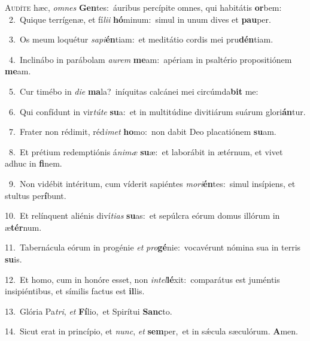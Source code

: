 \lettrine{\initial\textcolor{\initialcolor}{A}}{udíte} hæc, \textit{om}\-\textit{nes} \textbf{Gen}\-tes:~\star áuribus percípite omnes, qui habitátis \textbf{or}\-bem:\\
{\numbfont\textcolor{\numbcolor}{~2.}}~Quique terrígenæ, et fí\-\textit{li}\-\textit{i} \textbf{hó}\-minum:~\star simul in unum dives et \textbf{pau}\-per.\par
{\numbfont\textcolor{\numbcolor}{~3.}}~Os meum loquétur \textit{sa}\-\textit{pi}\textbf{én}tiam:~\star et meditátio cordis mei pru\-\textbf{dén}\-tiam.\par
{\numbfont\textcolor{\numbcolor}{~4.}}~Inclinábo in parábolam \textit{au}\-\textit{rem} \textbf{me}\-am:~\star apériam in psaltério propositiónem \textbf{me}\-am.\par
{\numbfont\textcolor{\numbcolor}{~5.}}~Cur timébo in \textit{di}\-\textit{e} \textbf{ma}\-la?~\star iníquitas calcánei mei circúmda\textbf{bit} me:\par
{\numbfont\textcolor{\numbcolor}{~6.}}~Qui confídunt in vir\-\textit{tú}\-\textit{te} \textbf{su}\-a:~\star et in multitúdine divitiárum suárum glori\-\textbf{án}\-tur.\par
{\numbfont\textcolor{\numbcolor}{~7.}}~Frater non rédimit, réd\-\textit{i}\-\textit{met} \textbf{ho}\-mo:~\star non dabit Deo placatiónem \textbf{su}\-am.\par
{\numbfont\textcolor{\numbcolor}{~8.}}~Et prétium redemptiónis á\-\textit{ni}\-\textit{mæ} \textbf{su}\-æ:~\star et laborábit in ætérnum, et vivet adhuc in \textbf{fi}\-nem.\par
{\numbfont\textcolor{\numbcolor}{~9.}}~Non vidébit intéritum, cum víderit sapiéntes \textit{mo}\-\textit{ri}\textbf{én}tes:~\star simul insípiens, et stultus per\-\textbf{í}\-bunt.\par
{\numbfont\textcolor{\numbcolor}{10.}}~Et relínquent aliénis diví\-\textit{ti}\-\textit{as} \textbf{su}\-as:~\star et sepúlcra eórum domus illórum in æ\-\textbf{tér}\-num.\par
{\numbfont\textcolor{\numbcolor}{11.}}~Tabernácula eórum in progénie \textit{et} \textit{pro}\-\textbf{gé}nie:~\star vocavérunt nómina sua in terris \textbf{su}\-is.\par
{\numbfont\textcolor{\numbcolor}{12.}}~Et homo, cum in honóre esset, non \textit{in}\-\textit{tel}\textbf{lé}xit:~\star comparátus est juméntis insipiéntibus, et símilis factus est \textbf{il}\-lis.\par
{\numbfont\textcolor{\numbcolor}{13.}}~Glória Pa\-\textit{tri}\-, \textit{et} \textbf{Fí}\-lio,~\star et Spirítui \textbf{Sanc}\-to.\par
{\numbfont\textcolor{\numbcolor}{14.}}~Sicut erat in princípio, et \textit{nunc}\-, \textit{et} \textbf{sem}\-per,~\star et in sǽcula sæculórum. \textbf{A}\-men.\par

